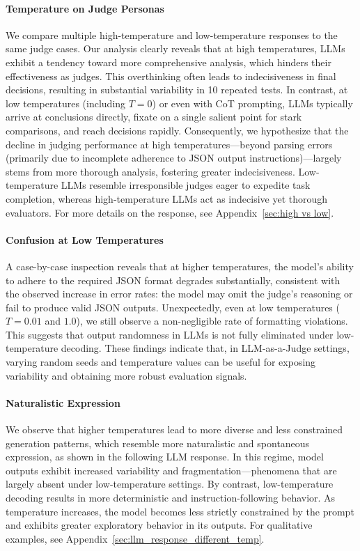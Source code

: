 \documentclass[11pt]{article}
\begin{document}
\paragraph{Temperature on Judge Personas} We compare multiple high-temperature and low-temperature responses to the same judge cases. Our analysis clearly reveals that at high temperatures, LLMs exhibit a tendency toward more comprehensive analysis, which hinders their effectiveness as judges. This overthinking often leads to indecisiveness in final decisions, resulting in substantial variability in 10 repeated tests. In contrast, at low temperatures (including $T=0$) or even with CoT prompting, LLMs typically arrive at conclusions directly, fixate on a single salient point for stark comparisons, and reach decisions rapidly. Consequently, we hypothesize that the decline in judging performance at high temperatures---beyond parsing errors (primarily due to incomplete adherence to JSON output instructions)---largely stems from more thorough analysis, fostering greater indecisiveness. Low-temperature LLMs resemble irresponsible judges eager to expedite task completion, whereas high-temperature LLMs act as indecisive yet thorough evaluators. For more details on the response, see Appendix~\ref{sec:high vs low}.

\paragraph{Confusion at Low Temperatures}  A case-by-case inspection reveals that at higher temperatures, the model’s ability to adhere to the required JSON format degrades substantially, consistent with the observed increase in error rates: the model may omit the judge’s reasoning or fail to produce valid JSON outputs. Unexpectedly, even at low temperatures (\(T = 0.01\) and \(1.0\)), we still observe a non-negligible rate of formatting violations. This suggests that output randomness in LLMs is not fully eliminated under low-temperature decoding. These findings indicate that, in LLM-as-a-Judge settings, varying random seeds and temperature values can be useful for exposing variability and obtaining more robust evaluation signals.


\paragraph{Naturalistic Expression} We observe that higher temperatures lead to more diverse and less constrained generation patterns, which resemble more naturalistic and spontaneous expression, as shown in the following LLM response. In this regime, model outputs exhibit increased variability and fragmentation—phenomena that are largely absent under low-temperature settings. By contrast, low-temperature decoding results in more deterministic and instruction-following behavior. As temperature increases, the model becomes less strictly constrained by the prompt and exhibits greater exploratory behavior in its outputs. For qualitative examples, see Appendix~\ref{sec:llm_response_different_temp}.
\end{document}
